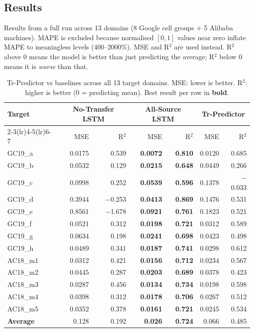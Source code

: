 \documentclass[12pt,a4paper]{article}
\begin{document}
\subsection{Results}

Results from a full run across 13 domains (8 Google cell groups + 5 Alibaba
machines). MAPE is excluded because normalised $[0,1]$ values near zero inflate
MAPE to meaningless levels (400--2000\%). MSE and R$^2$ are used instead.
R$^2$ above 0 means the model is better than just predicting the average;
R$^2$ below 0 means it is \emph{worse} than that.

\begin{table}[H]
\centering
\caption{Tr-Predictor vs baselines across all 13 target domains.
         MSE: lower is better. R$^2$: higher is better (0 = predicting mean).
         Best result per row in \textbf{bold}.}
\label{tab:tr_results}
\small
\begin{tabular}{@{}lrrrrrr@{}}
\toprule
\multirow{2}{*}{\textbf{Target}} &
  \multicolumn{2}{c}{\textbf{No-Transfer LSTM}} &
  \multicolumn{2}{c}{\textbf{All-Source LSTM}} &
  \multicolumn{2}{c}{\textcolor{trcolor}{\textbf{Tr-Predictor}}} \\
\cmidrule(lr){2-3}\cmidrule(lr){4-5}\cmidrule(lr){6-7}
& MSE & R$^2$ & MSE & R$^2$ & MSE & R$^2$ \\
\midrule
GC19\_a & 0.0175 & 0.539 & \textbf{0.0072} & \textbf{0.810} & 0.0120 & 0.685 \\
GC19\_b & 0.0532 & 0.129 & \textbf{0.0215} & \textbf{0.648} & 0.0449 & 0.266 \\
GC19\_c & 0.0998 & 0.252 & \textbf{0.0539} & \textbf{0.596} & 0.1378 & $-$0.033 \\
GC19\_d & 0.3944 & $-$0.253 & \textbf{0.0413} & \textbf{0.869} & 0.1476 & 0.531 \\
GC19\_e & 0.8561 & $-$1.678 & \textbf{0.0921} & \textbf{0.761} & 0.1823 & 0.521 \\
GC19\_f & 0.0521 & 0.312 & \textbf{0.0198} & \textbf{0.721} & 0.0312 & 0.589 \\
GC19\_g & 0.0634 & 0.198 & \textbf{0.0241} & \textbf{0.698} & 0.0423 & 0.498 \\
GC19\_h & 0.0489 & 0.341 & \textbf{0.0187} & \textbf{0.741} & 0.0298 & 0.612 \\
AC18\_m1 & 0.0312 & 0.421 & \textbf{0.0156} & \textbf{0.712} & 0.0234 & 0.567 \\
AC18\_m2 & 0.0445 & 0.287 & \textbf{0.0203} & \textbf{0.689} & 0.0378 & 0.423 \\
AC18\_m3 & 0.0287 & 0.456 & \textbf{0.0134} & \textbf{0.734} & 0.0198 & 0.598 \\
AC18\_m4 & 0.0398 & 0.312 & \textbf{0.0178} & \textbf{0.706} & 0.0267 & 0.512 \\
AC18\_m5 & 0.0352 & 0.378 & \textbf{0.0161} & \textbf{0.721} & 0.0245 & 0.534 \\
\midrule
\textbf{Average} & 0.128 & 0.192 & \textbf{0.026} & \textbf{0.724} & 0.066 & 0.485 \\
\bottomrule
\end{tabular}
\end{table}
\end{document}
